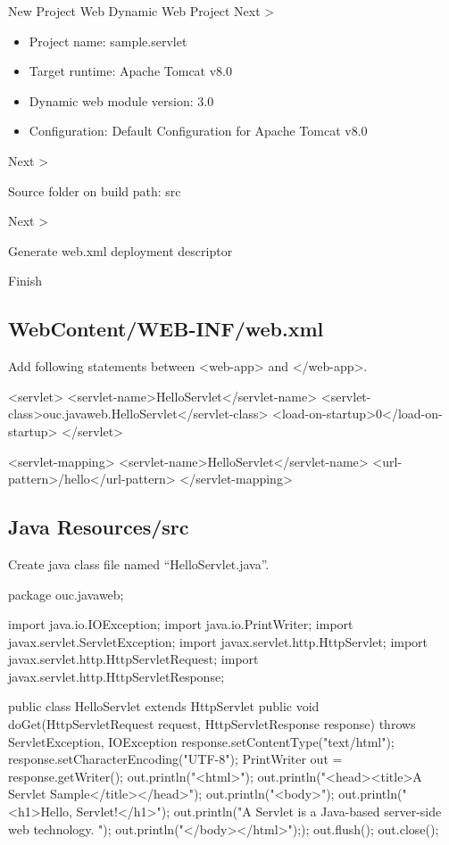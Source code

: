 New Project  Web  Dynamic Web Project  Next >

\begin{itemize}
\item Project name: {\Blue sample.servlet}
\item Target runtime: {\Blue Apache Tomcat v8.0}
\item Dynamic web module version: 3.0
\item Configuration: {\Blue Default Configuration for Apache Tomcat v8.0}
\end{itemize}

 Next >

Source folder on build path: {\Blue src}

 Next >

{\Blue{}} Generate web.xml deployment descriptor

 Finish

\subsection{WebContent/WEB-INF/web.xml}

Add following statements between <web-app> and </web-app>.

\begin{xmlCode}
  <servlet>
    <servlet-name>HelloServlet</servlet-name>
    <servlet-class>ouc.javaweb.HelloServlet</servlet-class>
    <load-on-startup>0</load-on-startup>
  </servlet>
    
  <servlet-mapping>
    <servlet-name>HelloServlet</servlet-name>
    <url-pattern>/hello</url-pattern>
  </servlet-mapping>  
\end{xmlCode}

\subsection{Java Resources/src}

Create java class file named ``HelloServlet.java''.

\begin{javaCode}
  package ouc.javaweb;

  import java.io.IOException;
  import java.io.PrintWriter;
  import javax.servlet.ServletException;
  import javax.servlet.http.HttpServlet;
  import javax.servlet.http.HttpServletRequest;
  import javax.servlet.http.HttpServletResponse;

  public class HelloServlet extends HttpServlet {
    public void doGet(HttpServletRequest request, HttpServletResponse response)
    throws ServletException, IOException {
      response.setContentType("text/html");
      response.setCharacterEncoding("UTF-8");
      PrintWriter out = response.getWriter();
      out.println("<html>");
      out.println("<head><title>A Servlet Sample</title></head>");
      out.println("<body>");
      out.println("<h1>Hello, Servlet!</h1>");
      out.println("A Servlet is a Java-based server-side web technology. ");
      out.println("</body></html>"););
      out.flush();
      out.close();
    }
  }
\end{javaCode}

